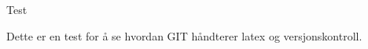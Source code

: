 \documentclass[11pt]{article}
\begin{document}
\begin{titlepage}
Test
\end{titlepage}
Dette er en test for å se hvordan GIT håndterer latex og versjonskontroll.
\end{document}
